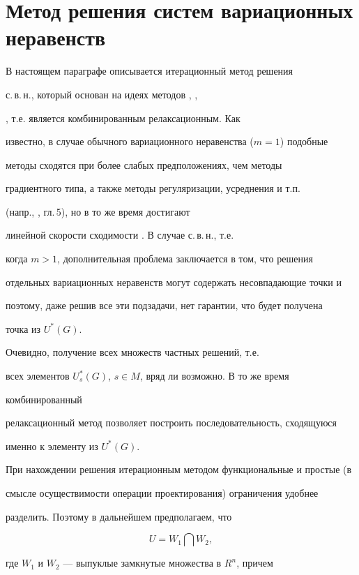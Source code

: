 \section{Метод решения систем вариационных неравенств}





В настоящем параграфе описывается итерационный метод решения


с.\,в.\,н., который основан на идеях методов \cite{Kon3}, \cite{Kon2},


\cite{Kon1}, т.е. является комбинированным релаксационным. Как


известно, в случае обычного вариационного неравенства ($m=1$) подобные


методы сходятся при более слабых предположениях, чем методы


градиентного типа, а также методы регуляризации, усреднения и т.п.


(напр., \cite{Gol}, гл.\,5), но в то же время достигают


линейной скорости сходимости \cite{Kon3}. В случае с.\,в.\,н., т.е.


когда $m>1$, дополнительная проблема заключается в том, что решения


отдельных вариационных неравенств могут содержать несовпадающие точки и


поэтому, даже решив все эти подзадачи, нет гарантии, что будет получена


точка из $U^*(G)$.


Очевидно, получение всех множеств частных решений, т.е.


всех элементов $U^*_s(G)$, $s\in M$, вряд ли возможно. В то же время


комбинированный


релаксационный метод позволяет построить последовательность, сходящуюся


именно к элементу из $U^*(G)$.





При нахождении решения итерационным методом функциональные и простые (в


смысле осуществимости операции проектирования) ограничения удобнее


разделить. Поэтому в дальнейшем предполагаем, что


$$


U=W_1\bigcap W_2,


$$


где $W_1$ и $W_2$ --- выпуклые замкнутые множества в $R^n$, причем


